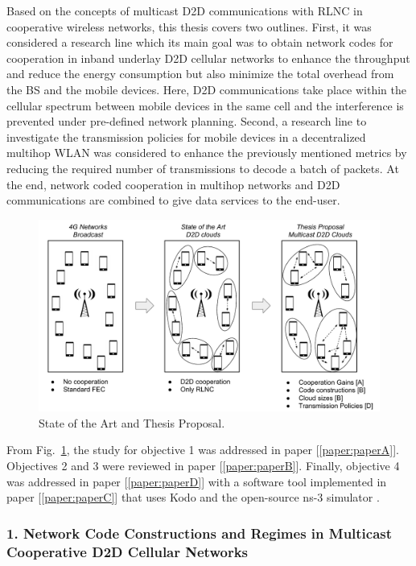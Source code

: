 Based on the concepts of multicast \ac{D2D} communications with \ac{RLNC} in cooperative wireless networks, this thesis covers two outlines. First, it was considered a research line which its main goal was to obtain network codes for cooperation in inband underlay \ac{D2D} cellular networks to enhance the throughput and reduce the energy consumption but also minimize the total overhead from the \ac{BS} and the mobile devices. Here, \ac{D2D} communications take place within the cellular spectrum between mobile devices in the same cell and the interference is prevented under pre-defined network planning. Second, a research line to investigate the transmission policies for mobile devices in a decentralized multihop \ac{WLAN} was considered to enhance the previously mentioned metrics by reducing the required number of transmissions to decode a batch of packets. At the end, network coded cooperation in multihop networks and \ac{D2D} communications are combined to give data services to the end-user.


\begin{figure}[h]
  \centering
  \includegraphics[width=\textwidth]{introduction/figures/thesis-diagrams.pdf}
  \caption{State of the Art and Thesis Proposal.}
\label{fig:proposal}
\end{figure}

From Fig.~\ref{fig:proposal}, the study for objective 1 was addressed in paper {[\ref{paper:paperA}]}. Objectives 2 and 3 were reviewed in paper {[\ref{paper:paperB}]}. Finally, objective 4 was addressed in paper {[\ref{paper:paperD}]} with a software tool implemented in paper {[\ref{paper:paperC}]} that uses Kodo and the open-source ns-3 simulator \cite{ns3link}.

\subsubsection{1. Network Code Constructions and Regimes in Multicast Cooperative D2D Cellular Networks}

